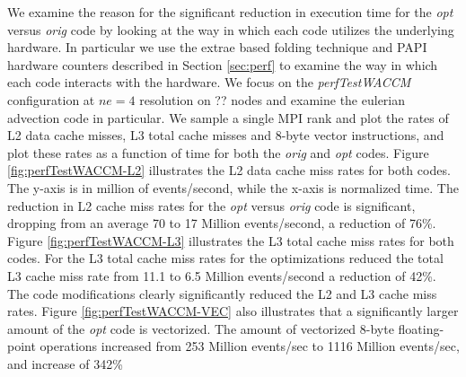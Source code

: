 We examine the reason for the significant reduction in execution time for the {\em opt} versus {\em orig} code by looking at the way in which each code utilizes the underlying hardware.  In particular we use the extrae based folding technique and PAPI hardware counters described in Section \ref{sec:perf} to examine the way in which each code interacts with the hardware.  We focus on the {\em perfTestWACCM} configuration at $ne=4$ resolution on {\color{red} ??} nodes and examine the eulerian advection code in particular.  We sample a single MPI rank and plot the rates of L2 data cache misses, L3 total cache misses and 8-byte vector instructions, and plot these rates as a function of time for both the {\em orig} and {\em opt} codes.  Figure \ref{fig:perfTestWACCM-L2} illustrates the L2 data cache miss rates for both codes. The y-axis is in million of events/second, while the x-axis is normalized time.  The reduction in L2 cache miss rates for the {\em opt} versus {\em orig} code is significant, dropping from an average 70 to 17 Million events/second, a reduction of 76\%.  Figure \ref{fig:perfTestWACCM-L3} illustrates the L3 total cache miss rates for both codes.  For the L3 total cache miss rates for the optimizations reduced the total L3 cache miss rate from 11.1 to 6.5 Million events/second a reduction of 42\%.  The code modifications clearly significantly reduced the L2 and L3 cache miss rates.  Figure \ref{fig:perfTestWACCM-VEC} also illustrates that a significantly larger amount of the {\em opt} code is vectorized.  The amount of vectorized 8-byte floating-point operations increased from 253 Million events/sec to 1116 Million events/sec, and increase of 342\%

